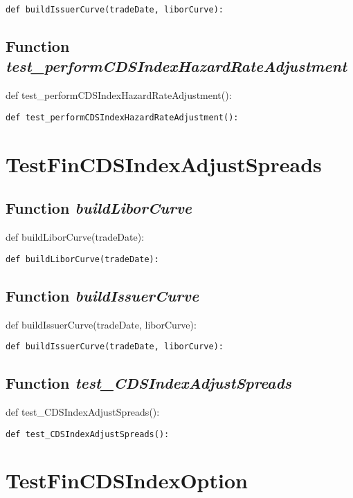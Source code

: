 \documentclass[twoside,11pt]{book}
\begin{document}
\begin{lstlisting}
def buildIssuerCurve(tradeDate, liborCurve):
\end{lstlisting}

\subsection{Function {\it test\_performCDSIndexHazardRateAdjustment}}
def test\_performCDSIndexHazardRateAdjustment():

\begin{lstlisting}
def test_performCDSIndexHazardRateAdjustment():
\end{lstlisting}


\newpage
\section{TestFinCDSIndexAdjustSpreads}

\subsection{Function {\it buildLiborCurve}}
def buildLiborCurve(tradeDate):

\begin{lstlisting}
def buildLiborCurve(tradeDate):
\end{lstlisting}

\subsection{Function {\it buildIssuerCurve}}
def buildIssuerCurve(tradeDate, liborCurve):

\begin{lstlisting}
def buildIssuerCurve(tradeDate, liborCurve):
\end{lstlisting}

\subsection{Function {\it test\_CDSIndexAdjustSpreads}}
def test\_CDSIndexAdjustSpreads():

\begin{lstlisting}
def test_CDSIndexAdjustSpreads():
\end{lstlisting}


\newpage
\section{TestFinCDSIndexOption}
\end{document}
